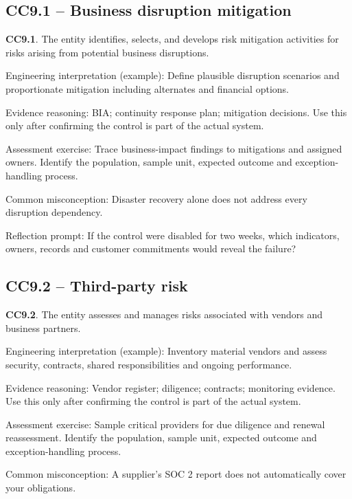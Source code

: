 \documentclass[10pt,oneside]{report}
\begin{document}
\subsection{CC9.1 -- Business disruption mitigation}
\begin{aicpabox}
\textbf{CC9.1}. The entity identifies, selects, and develops risk mitigation activities for risks arising from potential business disruptions.\par{}
\end{aicpabox}
Engineering interpretation (example): Define plausible disruption scenarios and proportionate mitigation including alternates and financial options.

Evidence reasoning: BIA; continuity response plan; mitigation decisions. Use this only after confirming the control is part of the actual system.

Assessment exercise: Trace business-impact findings to mitigations and assigned owners. Identify the population, sample unit, expected outcome and exception-handling process.

Common misconception: Disaster recovery alone does not address every disruption dependency.

Reflection prompt: If the control were disabled for two weeks, which indicators, owners, records and customer commitments would reveal the failure?

\subsection{CC9.2 -- Third-party risk}
\begin{aicpabox}
\textbf{CC9.2}. The entity assesses and manages risks associated with vendors and business partners.\par{}
\end{aicpabox}
Engineering interpretation (example): Inventory material vendors and assess security, contracts, shared responsibilities and ongoing performance.

Evidence reasoning: Vendor register; diligence; contracts; monitoring evidence. Use this only after confirming the control is part of the actual system.

Assessment exercise: Sample critical providers for due diligence and renewal reassessment. Identify the population, sample unit, expected outcome and exception-handling process.

Common misconception: A supplier's SOC 2 report does not automatically cover your obligations.
\end{document}
